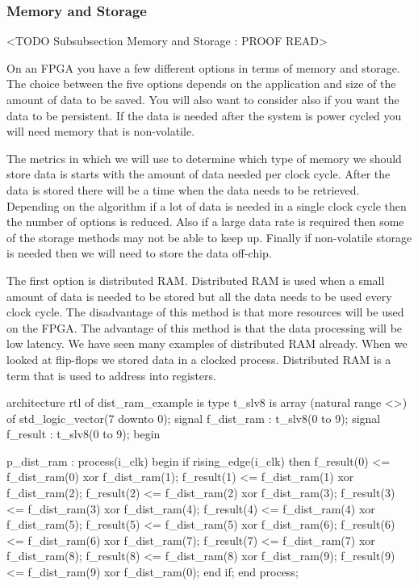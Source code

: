 	
\subsubsection{Memory and Storage}
	<TODO Subsubsection  Memory and Storage : PROOF READ>

On an \ac{FPGA} you have a few different options in terms of memory and storage. The choice between the five options depends on the application and size of the amount of data to be saved. You will also want to consider also if you want the data to be persistent. If the data is needed after the system is power cycled you will need memory that is non-volatile. 

The metrics in which we will use to determine which type of memory we should store data is starts with the amount of data needed per clock cycle. After the data is stored there will be a time when the data needs to be retrieved. Depending on the algorithm if a lot of data is needed in a single clock cycle then the number of options is reduced. Also if a large data rate is required then some of the storage methods may not be able to keep up. Finally if non-volatile storage is needed then we will need to store the data off-chip. 

The first option is distributed \ac{RAM}. Distributed \ac{RAM} is used when a small amount of data is needed to be stored but all the data needs to be used every clock cycle. The disadvantage of this method is that more resources will be used on the \ac{FPGA}. The advantage of this method is that the data processing will be low latency. We have seen many examples of distributed \ac{RAM} already. When we looked at flip-flops we stored data in a clocked process. Distributed \ac{RAM} is a term that is used to address into registers. 

\begin{VHDLlisting}[tabsize=4]
architecture rtl of dist_ram_example is
	type t_slv8 is array (natural range <>) of std_logic_vector(7 downto 0);
	signal f_dist_ram : t_slv8(0 to 9);
	signal f_result   : t_slv8(0 to 9);
begin

p_dist_ram : process(i_clk)
begin
	if rising_edge(i_clk) then
		f_result(0) <= f_dist_ram(0) xor f_dist_ram(1);
		f_result(1) <= f_dist_ram(1) xor f_dist_ram(2);
		f_result(2) <= f_dist_ram(2) xor f_dist_ram(3);
		f_result(3) <= f_dist_ram(3) xor f_dist_ram(4);
		f_result(4) <= f_dist_ram(4) xor f_dist_ram(5);
		f_result(5) <= f_dist_ram(5) xor f_dist_ram(6);
		f_result(6) <= f_dist_ram(6) xor f_dist_ram(7);
		f_result(7) <= f_dist_ram(7) xor f_dist_ram(8);
		f_result(8) <= f_dist_ram(8) xor f_dist_ram(9);
		f_result(9) <= f_dist_ram(9) xor f_dist_ram(0);
	end if;
end process;
\end{VHDLlisting}

